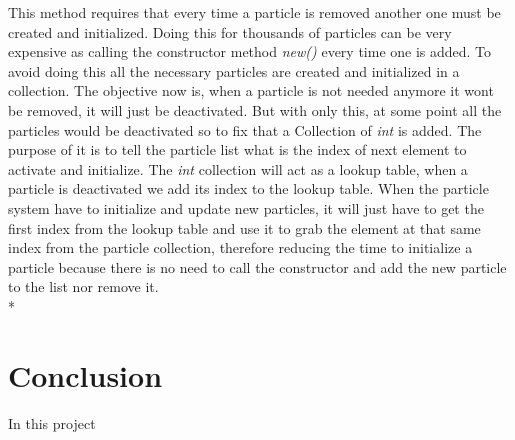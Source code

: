 This method requires that every time a particle is removed another one must be created and initialized. Doing this for thousands of particles can be very expensive as calling the constructor method \emph{new()} every time one is added. To avoid doing this all the necessary particles are created and initialized in a collection. The objective now is, when a particle is not needed anymore it wont be removed, it will just be deactivated. But with only this, at some point all the particles would be deactivated so to fix that a Collection of \emph{int} is added. The purpose of it is to tell the particle list what is the index of next element to activate and initialize. The \emph{int} collection will act as a lookup table, when a particle is deactivated we add its index to the lookup table. When the particle system have to initialize and update new particles, it will just have to get the first index from the lookup table and use it to grab the element at that same index from the particle collection, therefore reducing the time to initialize a particle because there is no need to call the constructor and add the new particle to the list nor remove it.
\\*

\section{Conclusion}
In this project 


